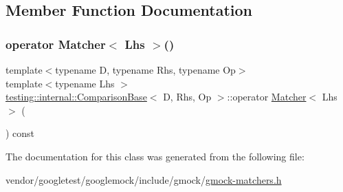 \subsection{Member Function Documentation}
\mbox{\label{classtesting_1_1internal_1_1_comparison_base_a071cdd47406c2e8df9c89bb99302eab9}} 
\subsubsection{\texorpdfstring{operator Matcher$<$ Lhs $>$()}{operator Matcher< Lhs >()}}
{\footnotesize\ttfamily template$<$typename D, typename Rhs, typename Op$>$ \\
template$<$typename Lhs $>$ \\
\hyperlink{classtesting_1_1internal_1_1_comparison_base}{testing\+::internal\+::\+Comparison\+Base}$<$ D, Rhs, Op $>$\+::operator \hyperlink{classtesting_1_1_matcher}{Matcher}$<$ Lhs $>$ (\begin{DoxyParamCaption}{ }\end{DoxyParamCaption}) const\hspace{0.3cm}{\ttfamily [inline]}}



The documentation for this class was generated from the following file\+:\begin{DoxyCompactItemize}
\item 
vendor/googletest/googlemock/include/gmock/\hyperlink{gmock-matchers_8h}{gmock-\/matchers.\+h}\end{DoxyCompactItemize}
